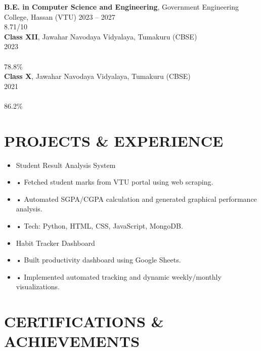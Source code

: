 \documentclass[10pt,a4paper]{article}
\begin{document}
\noindent \textbf{B.E. in Computer Science and Engineering}, Government Engineering College, Hassan (VTU) \hfill 2023 – 2027\\
\null \hfill 8.71/10\vspace{5pt}\\
\noindent \textbf{Class XII}, Jawahar Navodaya Vidyalaya, Tumakuru (CBSE) \hfill \\
\null \hfill 2023\vspace{5pt}\\
\noindent \textbf{} \hfill \\
\null \hfill 78.8\%\vspace{5pt}\\
\noindent \textbf{Class X}, Jawahar Navodaya Vidyalaya, Tumakuru (CBSE) \hfill \\
\null \hfill 2021\vspace{5pt}\\
\noindent \textbf{} \hfill \\
\null \hfill 86.2\%\vspace{5pt}\\



\section*{PROJECTS \& EXPERIENCE}

\begin{itemize}[leftmargin=*]
    \item Student Result Analysis System
    \item • Fetched student marks from VTU portal using web scraping.
    \item • Automated SGPA/CGPA calculation and generated graphical performance analysis.
    \item • Tech: Python, HTML, CSS, JavaScript, MongoDB.
    \item Habit Tracker Dashboard
    \item • Built productivity dashboard using Google Sheets.
    \item • Implemented automated tracking and dynamic weekly/monthly visualizations.
\end{itemize}




\section*{CERTIFICATIONS \& ACHIEVEMENTS}
\end{document}

